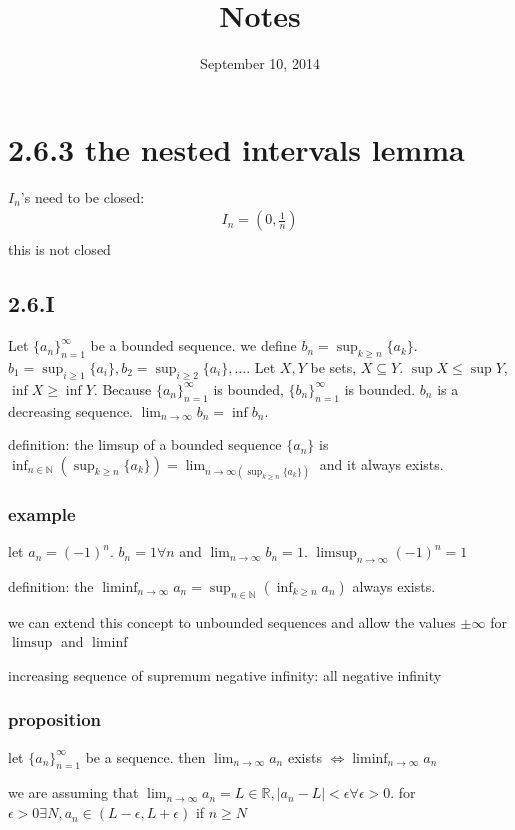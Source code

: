 \documentclass[letterpaper]{article}
\begin{document}
\title{Notes}
\date{September 10, 2014}
\maketitle
\section*{2.6.3 the nested intervals lemma}
$I_n$'s need to be closed:
\begin{align*}
  I_n=(0,\frac{1}{n})\\
\end{align*}
this is not closed
\subsection*{2.6.I}
Let $\{a_n\}_{n=1}^\infty$ be a bounded sequence. we define $b_n=\sup_{k\ge n}\{a_k\}$. $b_1=\sup_{i\ge 1}\{a_i\},b_2=\sup_{i\ge 2}\{a_i\},\dots$. Let $X,Y$ be sets, $X\subseteq Y$. $\sup X\le \sup Y$, $\inf X\ge \inf Y$. Because $\{a_n\}_{n=1}^\infty$ is bounded, $\{b_n\}_{n=1}^\infty$ is bounded. $b_n$ is a decreasing sequence. $\lim_{n\to\infty}b_n=\inf b_n$.

definition: the limsup of a bounded sequence $\{a_n\}$ is $\inf_{n\in\mathbb{N}}\left(\sup_{k\ge n}\{a_k\}\right)=\lim_{n\to\infty\left(\sup_{k\ge n}\{a_k\}\right)}$ and it always exists.

\subsubsection*{example}
let $a_n=(-1)^n$. $b_n=1\forall n$ and $\lim_{n\to\infty}b_n=1$. $\limsup_{n\to\infty}(-1)^n=1$

definition: the $\liminf_{n\to\infty}a_n=\sup_{n\in\mathbb{N}}\left(\inf_{k\ge n}a_n\right)$ always exists.

we can extend this concept to unbounded sequences and allow the values $\pm\infty$ for $\limsup$ and $\liminf$ 

increasing sequence of supremum negative infinity: all negative infinity

\subsubsection*{proposition}
let $\{a_n\}_{n=1}^\infty$ be a sequence. then $\lim_{n\to\infty}a_n$ exists $\Leftrightarrow\liminf_{n\to\infty}a_n$

we are assuming that $\lim_{n\to\infty}a_n=L\in\mathbb{R}, |a_n-L|<\epsilon\forall\epsilon>0$. for $\epsilon>0\exists N, a_n\in(L-\epsilon,L+\epsilon)$ if $n\ge N$
\end{document}
